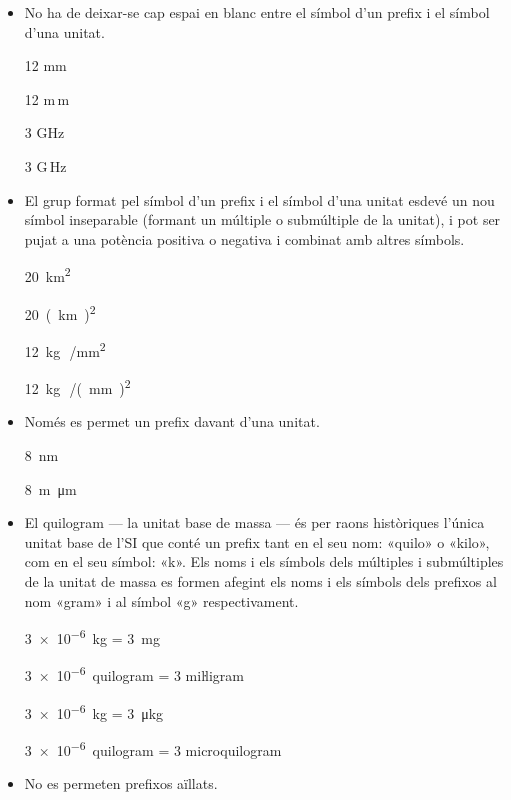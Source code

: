 \begin{itemize}
\textcolor{Red}\faTimesCircle{} \qty{5}{m.kg/s^3.A}

\textcolor{Red}\faTimesCircle{} \qty{5}{m.kg/s^3/A}


\item No ha de deixar-se cap espai en blanc entre el símbol d'un prefix i
el símbol d'una unitat.

\textcolor{Green}\faCheckSquare{} 12 mm

\textcolor{Red}\faTimesCircle{} 12 m\,m

\textcolor{Green}\faCheckSquare{}  3 GHz

\textcolor{Red}\faTimesCircle{}  3 G\,Hz


\item El grup format pel símbol d'un prefix i el símbol d'una unitat
esdevé un nou símbol inseparable (formant un múltiple o submúltiple
de la unitat), i pot ser pujat a una potència positiva o negativa i
combinat amb altres símbols.

\textcolor{Green}\faCheckSquare{} \qty{20}{km^2}

\textcolor{Red}\faTimesCircle{} \qty{20}{(km)^2}

\textcolor{Green}\faCheckSquare{}  \qty{12}{kg\,/mm^2}

\textcolor{Red}\faTimesCircle{}  \qty{12}{kg\,/(mm)^2}


\item Només es permet un prefix davant d'una unitat.

\textcolor{Green}\faCheckSquare{} \qty{8}{nm}

\textcolor{Red}\faTimesCircle{} \qty{8}{m\micro m}


\item El quilogram --- la unitat base de massa --- és per raons històriques l'única unitat base de l'SI que conté un prefix tant en el seu nom: «quilo» o «kilo», com en el seu símbol: «k». Els noms i els símbols dels múltiples i submúltiples de la unitat de massa es formen afegint els noms i els símbols dels prefixos al nom «gram» i al símbol «g» respectivament.

\textcolor{Green}\faCheckSquare{} \qty{3e-6}{kg} = \qty{3}{mg}

\textcolor{Green}\faCheckSquare{} \qty{3e-6}{quilogram} = 3 miŀligram

\textcolor{Red}\faTimesCircle{} \qty{3e-6}{kg} = \qty{3}{\micro kg}

\textcolor{Red}\faTimesCircle{} \qty{3e-6}{quilogram} = 3 microquilogram

\item No es permeten prefixos aïllats.


\end{itemize}
